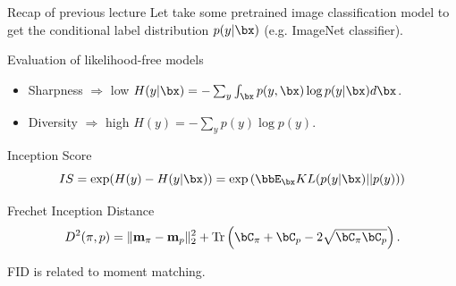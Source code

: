 \begin{frame}{Recap of previous lecture}
	Let take some pretrained image classification model to get the conditional label distribution $p(y | \bx)$ (e.g. ImageNet classifier).
	\begin{block}{Evaluation of likelihood-free models}
		\begin{itemize}
			\item Sharpness $\Rightarrow$ low $H(y | \bx) = - \sum_{y} \int_{\bx} p(y, \bx) \log p(y | \bx) d\bx$.
			\item Diversity $\Rightarrow$ high $H(y)  = - \sum_{y} p(y) \log p(y)$.
		\end{itemize}
	\end{block}
	\vspace{-0.3cm}
	\begin{block}{Inception Score}
		\vspace{-0.2cm}
		\[
			IS = \exp(H(y) - H(y | \bx)) = \exp \left( \bbE_{\bx} KL(p(y | \bx) || p(y)) \right)
		\]
		\vspace{-0.5cm}
	\end{block}
	\begin{block}{Frechet Inception Distance}
		\vspace{-0.3cm}
		\[
			D^2 (\pi, p) = \| \mathbf{m}_{\pi} - \mathbf{m}_{p}\|_2^2 + \text{Tr} \left( \bC_{\pi} + \bC_p - 2 \sqrt{\bC_{\pi} \bC_p} \right).
		\]
		\vspace{-0.5cm}
	\end{block}
	FID is related to moment matching.
	
\end{frame}
